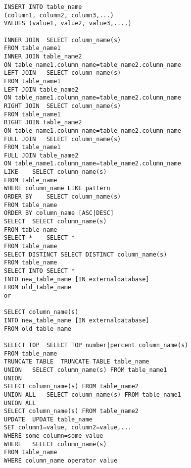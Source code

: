 \begin{verbatim}
INSERT INTO table_name
(column1, column2, column3,...)
VALUES (value1, value2, value3,....)

INNER JOIN	SELECT column_name(s)
FROM table_name1
INNER JOIN table_name2
ON table_name1.column_name=table_name2.column_name
LEFT JOIN	SELECT column_name(s)
FROM table_name1
LEFT JOIN table_name2
ON table_name1.column_name=table_name2.column_name
RIGHT JOIN	SELECT column_name(s)
FROM table_name1
RIGHT JOIN table_name2
ON table_name1.column_name=table_name2.column_name
FULL JOIN	SELECT column_name(s)
FROM table_name1
FULL JOIN table_name2
ON table_name1.column_name=table_name2.column_name
LIKE	SELECT column_name(s)
FROM table_name
WHERE column_name LIKE pattern
ORDER BY	SELECT column_name(s)
FROM table_name
ORDER BY column_name [ASC|DESC]
SELECT	SELECT column_name(s)
FROM table_name
SELECT *	SELECT *
FROM table_name
SELECT DISTINCT	SELECT DISTINCT column_name(s)
FROM table_name
SELECT INTO	SELECT *
INTO new_table_name [IN externaldatabase]
FROM old_table_name
or

SELECT column_name(s)
INTO new_table_name [IN externaldatabase]
FROM old_table_name

SELECT TOP	SELECT TOP number|percent column_name(s)
FROM table_name
TRUNCATE TABLE	TRUNCATE TABLE table_name
UNION	SELECT column_name(s) FROM table_name1
UNION
SELECT column_name(s) FROM table_name2
UNION ALL	SELECT column_name(s) FROM table_name1
UNION ALL
SELECT column_name(s) FROM table_name2
UPDATE	UPDATE table_name
SET column1=value, column2=value,...
WHERE some_column=some_value
WHERE	SELECT column_name(s)
FROM table_name
WHERE column_name operator value

 \end{verbatim}